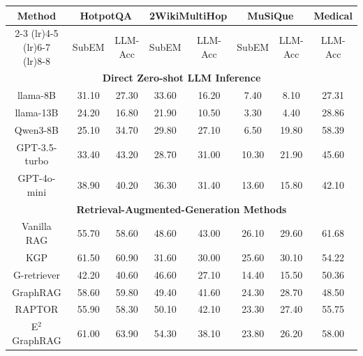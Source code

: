 \begin{table}[ht]
\centering
\renewcommand{\arraystretch}{0.9}
\begin{tabular}{c c c c c c c c}
\toprule
\multirow{2}{*}{\textbf{Method}} & \multicolumn{2}{c}{\textbf{HotpotQA}} & \multicolumn{2}{c}{\textbf{2WikiMultiHop}} & \multicolumn{2}{c}{\textbf{MuSiQue}} & \multicolumn{1}{c}{\textbf{Medical}} \\
\cmidrule(lr){2-3} \cmidrule(lr){4-5} \cmidrule(lr){6-7} \cmidrule(lr){8-8}
& SubEM & LLM-Acc & SubEM & LLM-Acc & SubEM & LLM-Acc & LLM-Acc \\
\midrule
\multicolumn{8}{c}{\textbf{Direct Zero-shot LLM Inference}} \\
\midrule
llama-8B & 31.10 & 27.30 & 33.60 & 16.20 & 7.40 & 8.10 & 27.31 \\
llama-13B & 24.20 & 16.80 & 21.90 & 10.50 & 3.30 & 4.40 & 28.86 \\
Qwen3-8B & 25.10 & 34.70 & 29.80 & 27.10 & 6.50 & 19.80 & 58.39\\
GPT-3.5-turbo & 33.40 & 43.20 & 28.70 & 31.00 & 10.30 & 21.90 & 45.60 \\
GPT-4o-mini & 38.90 & 40.20 & 36.30 & 31.40 & 13.60 & 15.80 & 42.10 \\
\midrule
\multicolumn{8}{c}{\textbf{Retrieval-Augmented-Generation Methods}} \\
\midrule
Vanilla RAG & 55.70 & 58.60 & 48.60 & 43.00 & 26.10 & 29.60 & 61.68 \\
KGP & 61.50 & 60.90 & 31.60 & 30.00 & 25.60 & 30.10 & 54.22 \\
G-retriever & 42.20 & 40.60 & 46.60 & 27.10 & 14.40 & 15.50 & 50.36 \\
GraphRAG & 58.60 & 59.80 & 49.40 & 41.60 & 24.30 & 28.70 & 48.50 \\
RAPTOR & 55.90 & 58.30 & 50.10 & 42.10 & 23.30 & 27.40 & 55.75 \\
E$^2$GraphRAG & 61.00 & 63.90 & 54.30 & 38.10 & 23.80 & 26.20 & 58.00 \\

\end{tabular}
\end{table}
